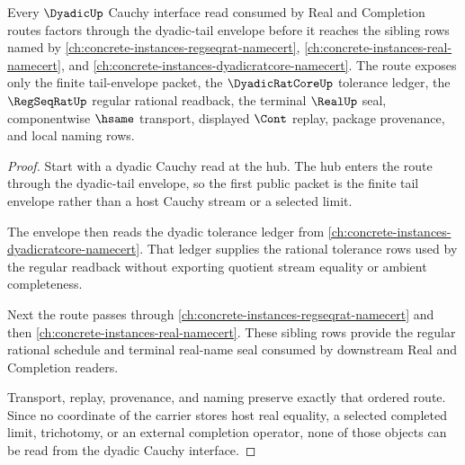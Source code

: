 \begin{theorem}
\label{thm:dyadic-cauchy-real-route-sibling-dependency}
Every $\DyadicUp$ Cauchy interface read consumed by Real and Completion routes factors through the dyadic-tail envelope before it reaches the sibling rows named by \autoref{ch:concrete-instances-regseqrat-namecert}, \autoref{ch:concrete-instances-real-namecert}, and \autoref{ch:concrete-instances-dyadicratcore-namecert}. The route exposes only the finite tail-envelope packet, the $\DyadicRatCoreUp$ tolerance ledger, the $\RegSeqRatUp$ regular rational readback, the terminal $\RealUp$ seal, componentwise $\hsame$ transport, displayed $\Cont$ replay, package provenance, and local naming rows.
\end{theorem}
\begin{proof}
Start with a dyadic Cauchy read at the hub. The hub enters the route through the dyadic-tail envelope, so the first public packet is the finite tail envelope rather than a host Cauchy stream or a selected limit.

The envelope then reads the dyadic tolerance ledger from \autoref{ch:concrete-instances-dyadicratcore-namecert}. That ledger supplies the rational tolerance rows used by the regular readback without exporting quotient stream equality or ambient completeness.

Next the route passes through \autoref{ch:concrete-instances-regseqrat-namecert} and then \autoref{ch:concrete-instances-real-namecert}. These sibling rows provide the regular rational schedule and terminal real-name seal consumed by downstream Real and Completion readers.

Transport, replay, provenance, and naming preserve exactly that ordered route. Since no coordinate of the carrier stores host real equality, a selected completed limit, trichotomy, or an external completion operator, none of those objects can be read from the dyadic Cauchy interface.
\end{proof}
